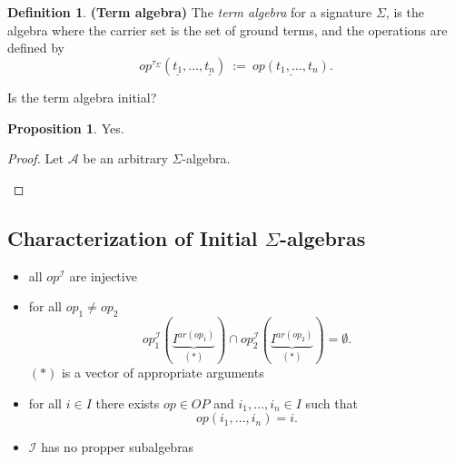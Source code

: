 \documentclass{amsart}
\theoremstyle{definition}
\newtheorem{definition}[thm]{Definition}
\newtheorem{proposition}[thm]{Proposition}
\newcommand{\ca}{\mathcal A} %
\begin{document}
\begin{definition}\textbf{(Term algebra)} The \textit{term algebra} for a signature $\Sigma$, is the algebra where the carrier set is the set of ground terms, and the operations are defined by
$$op^{\tau_\Sigma}(\underline{t_1}, \dots , \underline{t_n}) ~:=~ \underline{op(t_1, \dots, t_n)}.$$
\end{definition}

Is the term algebra initial? 

\begin{proposition}Yes.
\end{proposition}

\begin{proof} Let $\ca$ be an arbitrary $\Sigma$-algebra.
\begin{center}
\end{center}
\end{proof}

\subsection{Characterization of Initial $\Sigma$-algebras}
\begin{itemize}
\item all $op^{\mathcal I}$ are injective
\item for all $op_1 \neq op_2$
$$op^{\mathcal I}_1(\underbrace{I^{ar(op_1)}}_{(*)}) \cap op^{\mathcal I}_2(\underbrace{I^{ar(op_2)}}_{(*)}) = \emptyset.$$
$(*)$ is a vector of appropriate arguments
\item for all $i \in I$ there exists $op \in OP$ and $i_1, \dots, i_n \in I$ such that
$$ op(i_1, \dots, i_n) = i.$$
\item $\mathcal I$ has no propper subalgebras
\end{itemize}
\end{document}
